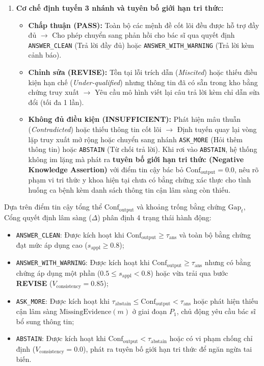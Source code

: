 \begin{enumerate}
    \item \textbf{Cơ chế định tuyến 3 nhánh và tuyên bố giới hạn tri thức:}
    \begin{itemize}
        \item \textbf{Chấp thuận (PASS):} Toàn bộ các mệnh đề cốt lõi đều được hỗ trợ đầy đủ $\rightarrow$ Cho phép chuyển sang phản hồi cho bác sĩ qua quyết định \texttt{ANSWER\_CLEAN} (Trả lời đầy đủ) hoặc \texttt{ANSWER\_WITH\_WARNING} (Trả lời kèm cảnh báo).
        \item \textbf{Chỉnh sửa (REVISE):} Tồn tại lỗi trích dẫn (\emph{Miscited}) hoặc thiếu điều kiện hạn chế (\emph{Under-qualified}) nhưng thông tin đã có sẵn trong kho bằng chứng truy xuất $\rightarrow$ Yêu cầu mô hình viết lại câu trả lời kèm chỉ dẫn sửa đổi (tối đa 1 lần).
        \item \textbf{Không đủ điều kiện (INSUFFICIENT):} Phát hiện mâu thuẫn (\emph{Contradicted}) hoặc thiếu thông tin cốt lõi $\rightarrow$ Định tuyến quay lại vòng lặp truy xuất mở rộng hoặc chuyển sang nhánh \texttt{ASK\_MORE} (Hỏi thêm thông tin) hoặc \texttt{ABSTAIN} (Từ chối trả lời). Khi rơi vào \texttt{ABSTAIN}, hệ thống không im lặng mà phát ra \textbf{tuyên bố giới hạn tri thức (Negative Knowledge Assertion)} với điểm tin cậy bác bỏ $\mathrm{Conf}_{\mathrm{output}} = 0.0$, nêu rõ phạm vi tri thức y khoa hiện tại chưa có bằng chứng xác thực cho tình huống ca bệnh kèm danh sách thông tin cận lâm sàng còn thiếu.
    \end{itemize}
\end{enumerate}

Dựa trên điểm tin cậy tổng thể $\mathrm{Conf}_{\mathrm{output}}$ và khoảng trống bằng chứng $\mathrm{Gap}_t$, Cổng quyết định lâm sàng ($\Delta$) phân định 4 trạng thái hành động:
\begin{itemize}
    \item \texttt{ANSWER\_CLEAN}: Được kích hoạt khi $\mathrm{Conf}_{\mathrm{output}} \ge \tau_{\mathrm{ans}}$ và toàn bộ bằng chứng đạt mức áp dụng cao ($s_{\mathrm{appl}} \ge 0.8$);
    \item \texttt{ANSWER\_WITH\_WARNING}: Được kích hoạt khi $\mathrm{Conf}_{\mathrm{output}} \ge \tau_{\mathrm{ans}}$ nhưng có bằng chứng áp dụng một phần ($0.5 \le s_{\mathrm{appl}} < 0.8$) hoặc vừa trải qua bước \textbf{REVISE} ($V_{\mathrm{consistency}} = 0.85$);
    \item \texttt{ASK\_MORE}: Được kích hoạt khi $\tau_{\mathrm{abstain}} \le \mathrm{Conf}_{\mathrm{output}} < \tau_{\mathrm{ans}}$ hoặc phát hiện thiếu cận lâm sàng $\mathrm{MissingEvidence}(m)$ ở giai đoạn $P_1$, chủ động yêu cầu bác sĩ bổ sung thông tin;
    \item \texttt{ABSTAIN}: Được kích hoạt khi $\mathrm{Conf}_{\mathrm{output}} < \tau_{\mathrm{abstain}}$ hoặc có vi phạm chống chỉ định ($V_{\mathrm{consistency}} = 0.0$), phát ra tuyên bố giới hạn tri thức để ngăn ngừa tai biến.
\end{itemize}

